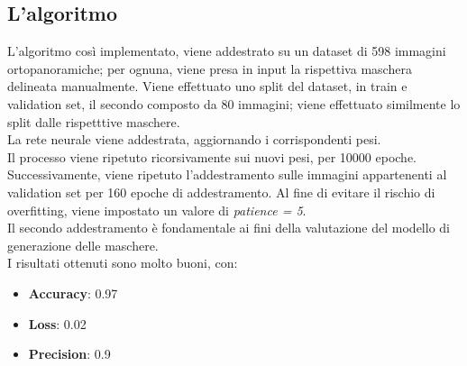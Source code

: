 \documentclass[12pt,a4paper,openright,twoside]{book}
\begin{document}
\subsection{L'algoritmo}
L'algoritmo così implementato, viene addestrato su un dataset di 598 immagini ortopanoramiche; per ognuna, viene presa in input la rispettiva maschera delineata manualmente. Viene effettuato uno split del dataset, in train e validation set, il secondo composto da 80 immagini; viene effettuato similmente lo split dalle rispetttive maschere.\\
La rete neurale viene addestrata, aggiornando i corrispondenti pesi.\\
Il processo viene ripetuto ricorsivamente sui nuovi pesi, per 10000 epoche. \\
Successivamente, viene ripetuto l'addestramento sulle immagini appartenenti al validation set per 160 epoche di addestramento. Al fine di evitare il rischio di overfitting, viene impostato un valore di {\itshape patience = 5}.\\

Il secondo addestramento è fondamentale ai fini della valutazione del modello di generazione delle maschere.\\
I risultati ottenuti sono molto buoni, con:
\begin{itemize}
\item \textbf{Accuracy}: 0.97
\item \textbf{Loss}: 0.02
\item \textbf{Precision}: 0.9
\end{itemize}
\end{document}
